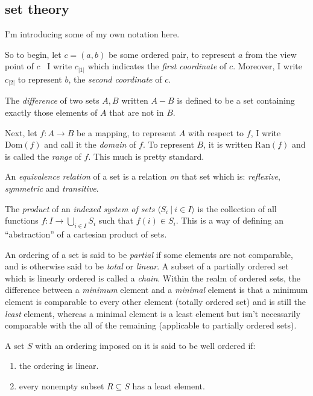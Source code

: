 \documentclass[twoside]{article}
\newenvironment{definition}[1][Definition]{\begin{trivlist}
\item[\hskip \labelsep {\bfseries #1}]}{\end{trivlist}}
\begin{document}
\subsection{set theory}

I'm introducing some of my own notation here.

So to begin, let $ c=(a, b) $ be some ordered pair, to represent $ a $ from the view point of $ c $ \ I write $ c_{|1|} $
which indicates the \emph{first coordinate} of $ c $.  Moreover, I write $ c_{|2|} $ to represent $ b $, the
\emph{second coordinate} of $ c $.

The \emph{difference} of two sets $ A, B $ written $ A-B $ is defined to be a set containing exactly those
elements of $ A $ that are not in $ B $.

Next, let $ f:A\to B $ be a mapping, to represent $ A $ with respect to $ f $, I write $ \mbox{Dom}(f) $ and call it
the \emph{domain} of $ f $.  To represent $ B $, it is written $ \mbox{Ran}(f) $ and is called the \emph{range} of $ f $.
This much is pretty standard.

An \emph{equivalence relation} of a set is a relation \emph{on} that set which is: \emph{reflexive}, \emph{symmetric}
and \emph{transitive}.

The \emph{product} of an \emph{indexed system of sets} $ \langle S_i\ |\ i\in I\rangle $ is the collection of all
functions $ f:I\to\bigcup_{i\in I} S_i $ such that $ f(i)\in S_i $.  This is a way of defining an ``abstraction''
of a cartesian product of sets.

An ordering of a set is said to be \emph{partial} if some elements are not comparable, and is otherwise said to be
\emph{total} or \emph{linear}.  A subset of a partially ordered set which is linearly ordered is called a \emph{chain}.
Within the realm of ordered sets, the difference between a \emph{minimum} element and a \emph{minimal} element is
that a minimum element is comparable to every other element (totally ordered set) and is still the \emph{least} element,
whereas a minimal element is a least element but isn't necessarily comparable with the all of the remaining
(applicable to partially ordered sets).

\begin{definition}[Well Ordered Set]

A set $ S $ with an ordering imposed on it is said to be well ordered if:

\begin{enumerate}

\item the ordering is linear.

\item every nonempty subset $ R\subseteq S $ has a least element.

\end{enumerate}

\end{definition}
\end{document}
